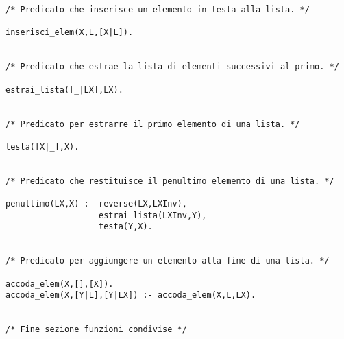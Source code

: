 \begin{verbatim}
/* Predicato che inserisce un elemento in testa alla lista. */

inserisci_elem(X,L,[X|L]).


/* Predicato che estrae la lista di elementi successivi al primo. */

estrai_lista([_|LX],LX).


/* Predicato per estrarre il primo elemento di una lista. */

testa([X|_],X).


/* Predicato che restituisce il penultimo elemento di una lista. */

penultimo(LX,X) :- reverse(LX,LXInv),
                   estrai_lista(LXInv,Y),
                   testa(Y,X).


/* Predicato per aggiungere un elemento alla fine di una lista. */

accoda_elem(X,[],[X]).
accoda_elem(X,[Y|L],[Y|LX]) :- accoda_elem(X,L,LX).


/* Fine sezione funzioni condivise */

\end{verbatim}